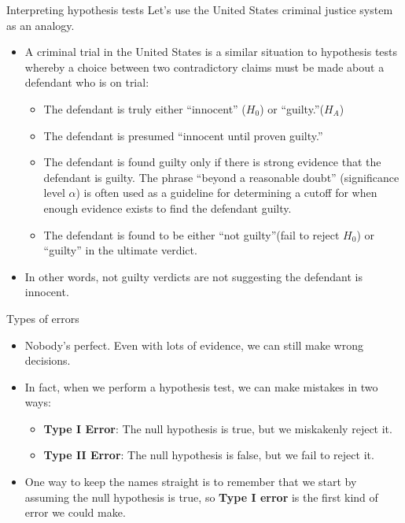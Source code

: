 \documentclass[
  ignorenonframetext,
]{beamer}
\providecommand{\tightlist}{%
  \setlength{\itemsep}{0pt}\setlength{\parskip}{0pt}}
\begin{document}
\begin{frame}{Interpreting hypothesis tests}
\label{interpreting-hypothesis-tests-2}
Let's use the United States criminal justice system as an analogy.

\begin{itemize}
\item
  A criminal trial in the United States is a similar situation to
  hypothesis tests whereby a choice between two contradictory claims
  must be made about a defendant who is on trial:

  \begin{itemize}
  \tightlist
  \item
    The defendant is truly either ``innocent'' (\(H_0\)) or
    ``guilty.''(\(H_A\))
  \item
    The defendant is presumed ``innocent until proven guilty.''
  \item
    The defendant is found guilty only if there is strong evidence that
    the defendant is guilty. The phrase ``beyond a reasonable doubt''
    (significance level \(\alpha\)) is often used as a guideline for
    determining a cutoff for when enough evidence exists to find the
    defendant guilty.
  \item
    The defendant is found to be either ``not guilty''(fail to reject
    \(H_0\)) or ``guilty'' in the ultimate verdict.
  \end{itemize}
\item
  In other words, not guilty verdicts are not suggesting the defendant
  is innocent.
\end{itemize}
\end{frame}

\begin{frame}{Types of errors}
\label{types-of-errors}
\begin{itemize}
\item
  Nobody's perfect. Even with lots of evidence, we can still make wrong
  decisions.
\item
  In fact, when we perform a hypothesis test, we can make mistakes in
  two ways:

  \begin{itemize}
  \tightlist
  \item
    \textbf{Type I Error}: The null hypothesis is true, but we
    miskakenly reject it.
  \item
    \textbf{Type II Error}: The null hypothesis is false, but we fail to
    reject it.
  \end{itemize}
\item
  One way to keep the names straight is to remember that we start by
  assuming the null hypothesis is true, so \textbf{Type I error} is the
  first kind of error we could make.
\end{itemize}
\end{frame}
\end{document}
